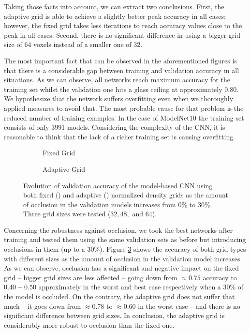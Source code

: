 Taking those facts into account, we can extract two conclusions. First, the adaptive grid is able to achieve a slightly better peak accuracy in all cases; however, the fixed grid takes less iterations to reach accuracy values close to the peak in all cases. Second, there is no significant difference in using a bigger grid size of $64$ voxels instead of a smaller one of $32$.

The most important fact that can be observed in the aforementioned figures is that there is a considerable gap between training and validation accuracy in all situations. As we can observe, all networks reach maximum accuracy for the training set whilst the validation one hits a glass ceiling at approximately $0.80$. We hypothesize that the network suffers overfitting even when we thoroughly applied measures to avoid that. The most probable cause for that problem is the reduced number of training examples. In the case of ModelNet10 the training set consists of only $3991$ models. Considering the complexity of the \acs{CNN}, it is reasonable to think that the lack of a richer training set is causing overfitting.

\begin{figure}[!b]
	\centering
		\begin{subfigure}{0.49\textwidth}
		
		\caption{Fixed Grid}
		\label{subfig:objrecog:3dcnn:experiments:25d_fixed_density_occlusion}
	\end{subfigure}
	\begin{subfigure}{0.49\textwidth}
		
		\caption{Adaptive Grid}
		\label{subfig:objrecog:3dcnn:experiments:25d_adaptive_density_occlusion}
	\end{subfigure}
	\caption{Evolution of validation accuracy of the model-based \acs{CNN} using both fixed () and adaptive () normalized density grids as the amount of occlusion in the validation models increases from $0\%$ to $30\%$. Three grid sizes were tested ($32, 48, $ and $64$).}
	\label{fig:objrecog:3dcnn:experiments:25d_density_occlusion}
\end{figure}

Concerning the robustness against occlusion, we took the best networks after training and tested them using the same validation sets as before but introducing occlusions in them (up to a $30\%$). Figure \ref{fig:objrecog:3dcnn:experiments:25d_density_occlusion} shows the accuracy of both grid types with different sizes as the amount of occlusion in the validation model increases. As we can observe, occlusion has a significant and negative impact on the fixed grid -- bigger grid sizes are less affected -- going down from $\approx0.75$ accuracy to $0.40 - 0.50$ approximately in the worst and best case respectively when a $30\%$ of the model is occluded. On the contrary, the adaptive grid does not suffer that much -- it goes down from $\approx0.78$ to $\approx0.60$ in the worst case -- and there is no significant difference between grid sizes. In conclusion, the adaptive grid is considerably more robust to occlusion than the fixed one.


